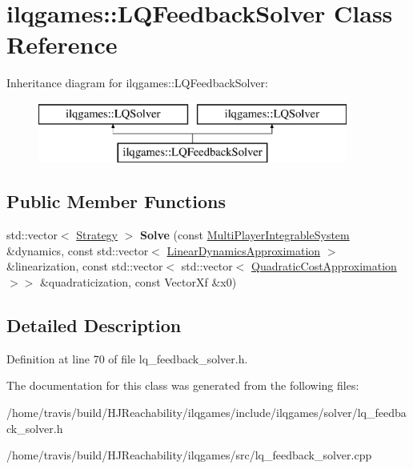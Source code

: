 \hypertarget{classilqgames_1_1_l_q_feedback_solver}{}\section{ilqgames\+:\+:L\+Q\+Feedback\+Solver Class Reference}
\label{classilqgames_1_1_l_q_feedback_solver}
Inheritance diagram for ilqgames\+:\+:L\+Q\+Feedback\+Solver\+:\begin{figure}[H]
\begin{center}
\leavevmode
\includegraphics[height=2.000000cm]{classilqgames_1_1_l_q_feedback_solver}
\end{center}
\end{figure}
\subsection*{Public Member Functions}
\begin{DoxyCompactItemize}
\item 
std\+::vector$<$ \hyperlink{structilqgames_1_1_strategy}{Strategy} $>$ {\bfseries Solve} (const \hyperlink{classilqgames_1_1_multi_player_integrable_system}{Multi\+Player\+Integrable\+System} \&dynamics, const std\+::vector$<$ \hyperlink{structilqgames_1_1_linear_dynamics_approximation}{Linear\+Dynamics\+Approximation} $>$ \&linearization, const std\+::vector$<$ std\+::vector$<$ \hyperlink{structilqgames_1_1_quadratic_cost_approximation}{Quadratic\+Cost\+Approximation} $>$$>$ \&quadraticization, const Vector\+Xf \&x0)\hypertarget{classilqgames_1_1_l_q_feedback_solver_a8031056a1aa380f204f78b4f08cd7a0c}{}\label{classilqgames_1_1_l_q_feedback_solver_a8031056a1aa380f204f78b4f08cd7a0c}

\end{DoxyCompactItemize}


\subsection{Detailed Description}


Definition at line 70 of file lq\+\_\+feedback\+\_\+solver.\+h.



The documentation for this class was generated from the following files\+:\begin{DoxyCompactItemize}
\item 
/home/travis/build/\+H\+J\+Reachability/ilqgames/include/ilqgames/solver/lq\+\_\+feedback\+\_\+solver.\+h\item 
/home/travis/build/\+H\+J\+Reachability/ilqgames/src/lq\+\_\+feedback\+\_\+solver.\+cpp\end{DoxyCompactItemize}
